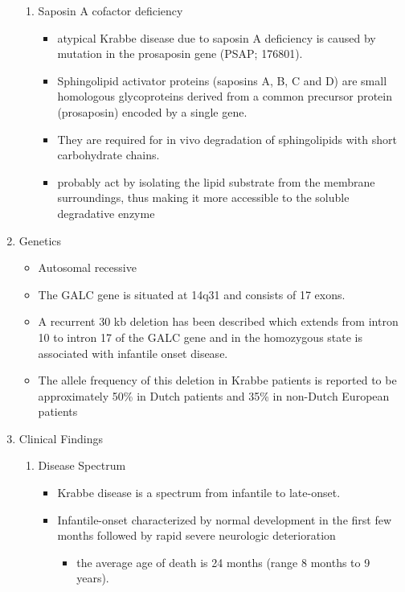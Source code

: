 \documentclass{scrartcl}
\begin{document}
\begin{enumerate}
\begin{enumerate}
\item Saposin A cofactor deficiency
\label{sec:org27133c3}

\begin{itemize}
\item atypical Krabbe disease due to saposin A deficiency is caused by mutation in the prosaposin gene (PSAP; 176801).
\item Sphingolipid activator proteins (saposins A, B, C and D) are small
homologous glycoproteins derived from a common precursor protein
(prosaposin) encoded by a single gene.
\item They are required for in vivo degradation of sphingolipids with short carbohydrate chains.
\item probably act by isolating the lipid substrate from the membrane
surroundings, thus making it more accessible to the soluble
degradative enzyme
\end{itemize}
\end{enumerate}

\item Genetics
\label{sec:org6fd871a}
\begin{itemize}
\item Autosomal recessive
\item The GALC gene is situated at 14q31 and consists of 17 exons.
\item A recurrent 30 kb deletion has been described which extends from
intron 10 to intron 17 of the GALC gene and in the homozygous state
is associated with infantile onset disease.
\item The allele frequency of this deletion in Krabbe patients is reported
to be approximately 50\% in Dutch patients and 35\% in non-Dutch
European patients
\end{itemize}

\item Clinical Findings
\label{sec:org68257c8}
\begin{enumerate}
\item Disease Spectrum
\label{sec:orgddd5f18}
\begin{itemize}
\item Krabbe disease is a spectrum from infantile to late-onset.

\item Infantile-onset characterized by normal development in the first few
months followed by rapid severe neurologic deterioration
\begin{itemize}
\item the average age of death is 24 months (range 8 months to 9 years).
\end{itemize}


\end{itemize}
\end{enumerate}
\end{enumerate}
\end{document}

